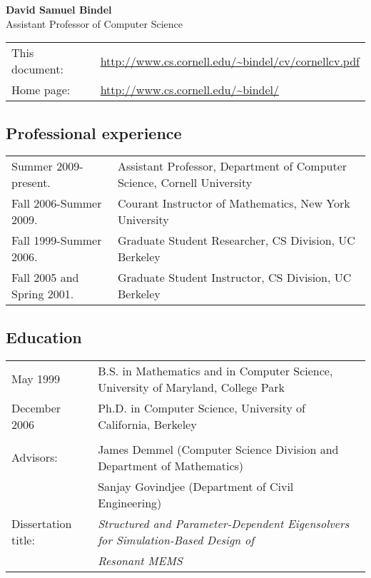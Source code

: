 \documentclass{article}
\begin{document}
\begin{center}
  {\Large \bf David Samuel Bindel} \\
  Assistant Professor of Computer Science \\[5mm]
  \begin{tabular}{ll}
  This document: & \url{http://www.cs.cornell.edu/~bindel/cv/cornellcv.pdf} \\
  Home page: & \url{http://www.cs.cornell.edu/~bindel/}
  \end{tabular}
\end{center}


\subsection*{Professional experience}

\begin{tabular}{ll}
  Summer 2009-present.
    & Assistant Professor, Department of Computer Science,
      Cornell University \\
  Fall 2006-Summer 2009.
    & Courant Instructor of Mathematics, New York University \\
  Fall 1999-Summer 2006.
    & Graduate Student Researcher, CS Division, UC Berkeley \\
  Fall 2005 and Spring 2001.
    & Graduate Student Instructor, CS Division, UC Berkeley
\end{tabular}

\subsection*{Education}

\begin{tabular}{ll}
May 1999 &
  B.S. in Mathematics and in Computer Science,
  University of Maryland, College Park \\
December 2006 &
  Ph.D. in Computer Science, University of California, Berkeley
\\
\\
Advisors:
 & James Demmel (Computer Science Division and Department of Mathematics) \\
 & Sanjay Govindjee (Department of Civil Engineering) \\
Dissertation title: &
   {\em Structured and Parameter-Dependent Eigensolvers for
        Simulation-Based Design of} \\
&  {\em Resonant MEMS}
\end{tabular}
\end{document}
